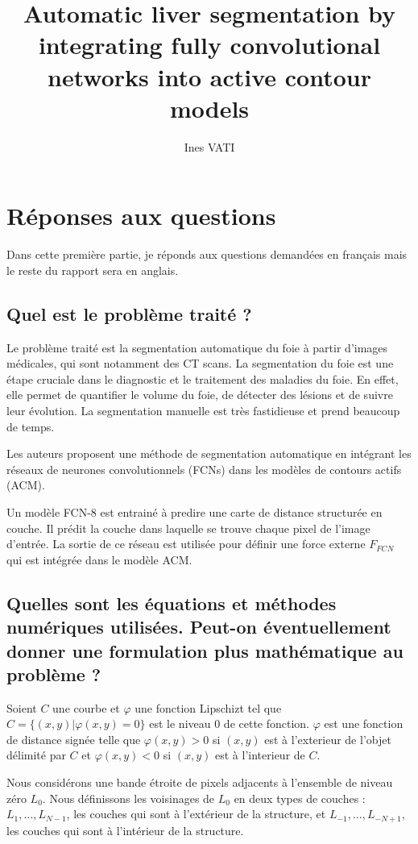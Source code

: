 \documentclass[a4paper, 11pt]{article}
\title{Automatic liver segmentation by integrating fully convolutional networks into active contour models}
\author[1, 2]{Ines VATI}
\affil[1]{École des Ponts ParisTech, Champs-sur-Marne, France}
\affil[2]{MVA, ENS Paris-Saclay, Cachan, France}
\affil[1, 2]{Email \email{ines.vati@eleves.enpc.fr}}
\date{}
\begin{document}
\maketitle

\section{Réponses aux questions}

Dans cette première partie, je réponds aux questions demandées en français mais le reste du rapport sera en anglais.

\subsection{Quel est le problème traité ?}
Le problème traité est la segmentation automatique du foie à partir d'images médicales, qui sont notamment des CT scans. La segmentation du foie est une étape cruciale dans le diagnostic et le traitement des maladies du foie. En effet, elle permet de quantifier le volume du foie, de détecter des lésions et de suivre leur évolution. La segmentation manuelle est très fastidieuse et prend beaucoup de temps. 

Les auteurs proposent une méthode de segmentation automatique en intégrant les réseaux de neurones convolutionnels (FCNs) dans les modèles de contours actifs (ACM). 

Un modèle FCN-$8$ est entrainé à predire une carte de distance structurée en couche. Il prédit la couche dans laquelle se trouve chaque pixel de l'image d'entrée. La sortie de ce réseau est utilisée pour définir une force externe $F_{FCN}$ qui est intégrée dans le modèle ACM.  

\subsection{Quelles sont les équations et méthodes numériques utilisées. Peut-on éventuellement donner une formulation plus mathématique au problème ?}

Soient $C$ une courbe et $\varphi$ une fonction Lipschizt tel que 
$C = \{(x, y) | \varphi(x, y) = 0\}$ est le niveau 0 de cette fonction. $\varphi$ est une fonction de distance signée telle que $\varphi(x, y) > 0$ 
si $(x, y)$ est à l'exterieur de l'objet délimité par $C$ et $\varphi(x, y) < 0$ si $(x, y)$ est à l'interieur de $C$.

Nous considérons une bande étroite de pixels adjacents à l'ensemble de niveau zéro $L_0$. Nous définissons les voisinages de $L_0$ en deux types de couches : $L_1, \dots, L_{N-1}$, les couches qui sont à l'extérieur de la structure, et $L_{-1}, \dots, L_{-N+1}$, les couches qui sont à l'intérieur de la structure.
\end{document}
